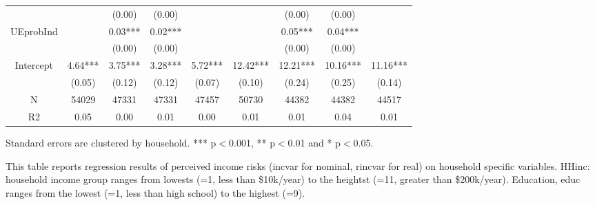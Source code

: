 \documentclass[12pt,notitlepage,onecolumn,aps,pra]{article}
\begin{document}
\begin{table}[p]
\begin{adjustbox}{width={0.9\textwidth}}
\begin{threeparttable}
\begin{tabular}{ccccccccc}
                 &          &    (0.00) &     (0.00) &             &           &     (0.00) &      (0.00) &              \\
UEprobInd        &          &   0.03*** &    0.02*** &             &           &    0.05*** &     0.04*** &              \\
                 &          &    (0.00) &     (0.00) &             &           &     (0.00) &      (0.00) &              \\
                 Intercept        &  4.64*** &   3.75*** &    3.28*** &     5.72*** &  12.42*** &   12.21*** &    10.16*** &     11.16*** \\
                 &   (0.05) &    (0.12) &     (0.12) &      (0.07) &    (0.10) &     (0.24) &      (0.25) &       (0.14) \\
                 \hline 
N                &    54029 &     47331 &      47331 &       47457 &     50730 &      44382 &       44382 &        44517 \\
R2               &     0.05 &      0.00 &       0.01 &        0.00 &      0.01 &       0.01 &        0.04 &         0.01 \\
\hline 
\end{tabular}
\begin{tablenotes}\item Standard errors are clustered by household. *** p$<$0.001, ** p$<$0.01 and * p$<$0.05. 
\item This table reports regression results of perceived income risks (incvar for nominal, rincvar for real) on household specific variables. HHinc: household income group ranges from lowests (=1, less than \$10k/year) to the heightst (=11, greater than \$200k/year). Education, educ ranges from the lowest (=1, less than high school) to the highest (=9).
\end{tablenotes}
\end{threeparttable}
\end{adjustbox}
\end{table}
\end{document}
